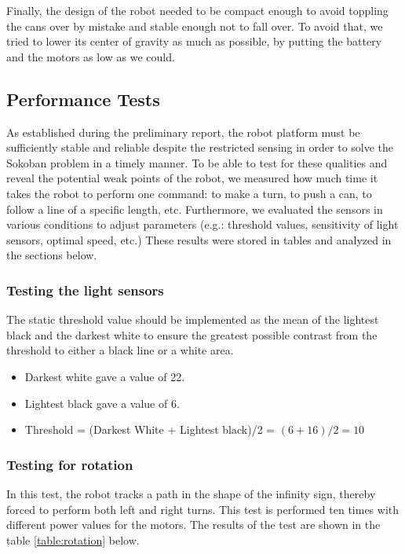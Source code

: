 \documentclass[a4paper,12pt]{article}
\begin{document}


Finally, the design of the robot needed to be compact enough to avoid toppling the cans over by mistake and stable enough not to fall over. To avoid that, we tried to lower its center of gravity as much as possible, by putting the battery and the motors as low as we could.

\subsection{Performance Tests}    %

As established during the preliminary report, the robot platform must be sufficiently stable and reliable despite the restricted sensing in order to solve the Sokoban problem in a timely manner. To be able to test for these qualities and reveal the potential weak points of the robot, we measured how much time it takes the robot to perform one command: to make a turn, to push a can, to follow a line of  a specific length, etc. Furthermore, we evaluated the sensors in various conditions to adjust parameters (e.g.: threshold values, sensitivity of light sensors, optimal speed, etc.)
These results were stored in tables and analyzed in the sections below.\newline

\subsubsection{Testing the light sensors}

The static threshold value should be implemented as the mean of the lightest black and the darkest white to ensure the greatest possible contrast from the threshold to either a black line or a white area.
\begin{itemize}
\item Darkest white gave a value of 22.
\item Lightest black gave a value of 6.
\item Threshold = (Darkest White + Lightest black)/2 = $(6 + 16)/2 = 10$\newline
\end{itemize}

\subsubsection{Testing for rotation}
In this test, the robot tracks a path in the shape of the infinity sign, thereby forced to perform both left and right turns. This test is performed ten times with different power values for the motors. The results of the test are shown in the table \ref{table:rotation} below.
\end{document}
